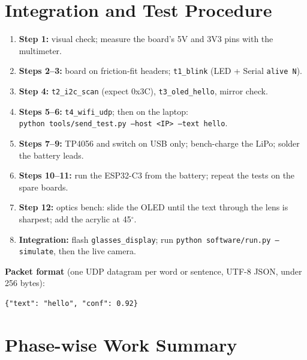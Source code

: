 \documentclass[12pt,a4paper]{report}
\begin{document}
\section{Integration and Test Procedure}
\label{sec:proc}
\begin{enumerate}
  \item \textbf{Step 1:} visual check; measure the board's 5V and 3V3 pins with the multimeter.
  \item \textbf{Steps 2--3:} board on friction-fit headers; \texttt{t1\_blink} (LED + Serial \texttt{alive N}).
  \item \textbf{Step 4:} \texttt{t2\_i2c\_scan} (expect 0x3C), \texttt{t3\_oled\_hello}, mirror check.
  \item \textbf{Steps 5--6:} \texttt{t4\_wifi\_udp}; then on the laptop:\\ \texttt{python tools/send\_test.py --host <IP> --text hello}.
  \item \textbf{Steps 7--9:} TP4056 and switch on USB only; bench-charge the LiPo; solder the battery leads.
  \item \textbf{Steps 10--11:} run the ESP32-C3 from the battery; repeat the tests on the spare boards.
  \item \textbf{Step 12:} optics bench: slide the OLED until the text through the lens is sharpest; add the acrylic at 45$^\circ$.
  \item \textbf{Integration:} flash \texttt{glasses\_display}; run \texttt{python software/run.py --simulate}, then the live camera.
\end{enumerate}

\textbf{Packet format} (one UDP datagram per word or sentence, UTF-8 JSON, under 256 bytes):
\begin{lstlisting}[numbers=none]
{"text": "hello", "conf": 0.92}
\end{lstlisting}

\section{Phase-wise Work Summary}
\end{document}
